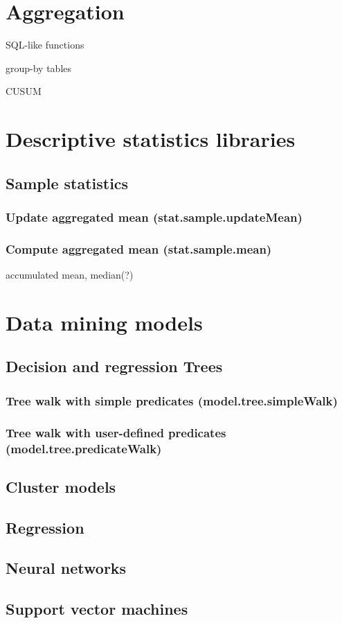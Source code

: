 \documentclass{article}
\theoremstyle{definition}
\begin{document}
\pagebreak

\section{Aggregation}

SQL-like functions

group-by tables

CUSUM

\pagebreak

\section{Descriptive statistics libraries}

\subsection{Sample statistics}

\subsubsection{Update aggregated mean (stat.sample.updateMean)}

\subsubsection{Compute aggregated mean (stat.sample.mean)}

accumulated mean, median(?)

\pagebreak

\section{Data mining models}

\subsection{Decision and regression Trees}

\subsubsection{Tree walk with simple predicates (model.tree.simpleWalk)}

\subsubsection{Tree walk with user-defined predicates (model.tree.predicateWalk)}

\subsection{Cluster models}

\subsection{Regression}

\subsection{Neural networks}

\subsection{Support vector machines}
\end{document}
